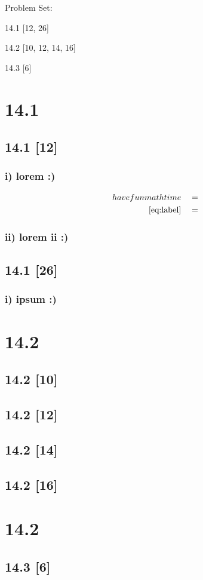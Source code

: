 \documentclass{article}
\begin{document}
{\large \noindent Problem Set:}

\par 14.1 [12, 26]
\par 14.2 [10, 12, 14, 16]
\par 14.3 [6]
\vspace{5mm}

\noindent \hrulefill

\section*{14.1}
\setcounter{equation}{0}

\subsection*{14.1 [12]}

\subsubsection*{i) lorem :)}

\begin{align}
    \label{eq:label}
    have fun math time && &=
    \\
    \label{eq:label2}
    \eqref{eq:label} && &=
\end{align}
\subsubsection*{ii) lorem ii :)}

\subsection*{14.1 [26]}

\subsubsection*{i) ipsum :)}

\newpage

\section*{14.2}
\setcounter{equation}{0}

\subsection*{14.2 [10]}
\subsection*{14.2 [12]}
\subsection*{14.2 [14]}
\subsection*{14.2 [16]}

\newpage

\section*{14.2}
\setcounter{equation}{0}

\subsection*{14.3 [6]}
\end{document}
